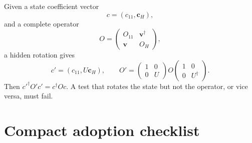 \documentclass[11pt]{article}
\begin{document}
Given a state coefficient vector
\begin{equation}
 c=(c_{11},\bm c_H),
\end{equation}
and a complete operator
\begin{equation}
 O=\begin{pmatrix}
 O_{11}&\bm v^\dagger\\
 \bm v&O_H
 \end{pmatrix},
\end{equation}
a hidden rotation gives
\begin{equation}
 c'=(c_{11},U\bm c_H),
 \qquad
 O'=\begin{pmatrix}
 1&0\\0&U
 \end{pmatrix}
 O
 \begin{pmatrix}
 1&0\\0&U^\dagger
 \end{pmatrix}.
\end{equation}
Then \(c'^\dagger O'c'=c^\dagger Oc\).  A test that rotates the state but not the operator, or vice versa, must fail.

\section{Compact adoption checklist}
\label{app:checklist}
\end{document}
